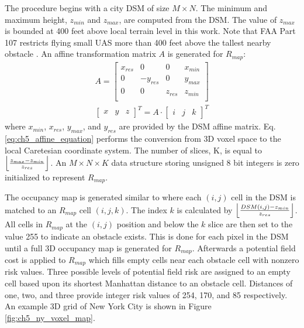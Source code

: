 The procedure begins with a city DSM of size $M\times N$. The minimum and maximum height, $z_{min}$ and $z_{max}$, are computed from the DSM. The value of $z_{max}$ is bounded at 400 feet above local terrain level in this work. Note that FAA Part 107 restricts flying small \ac{UAS} more than 400 feet above the tallest nearby obstacle \cite{federal_aviation_administration_code_2016}. An affine transformation matrix $A$ is generated for $R_{map}$:
\begin{align}
        A = \begin{bmatrix} \label{eq:ch5_affine_matrix}
        x_{res} & 0 & 0 & x_{min} \\
        0 &  -y_{res} & 0 & {y_{max}} \\
        0 &  0 & z_{res} & {z_{min}} \\
        \end{bmatrix}  \\
        \begin{bmatrix}x & y & z  \end{bmatrix}^T = A \cdot \begin{bmatrix}i & j & k  \end{bmatrix}^T \label{eq:ch5_affine_equation}
\end{align}
where $x_{min}$, $x_{res}$, $y_{max}$, and $y_{res}$ are provided by the DSM affine matrix. Eq. \ref{eq:ch5_affine_equation} performs the conversion from 3D voxel space to the local Caretesian coordinate system.  
The number of slices, K, is equal to $\floor*{\frac{z_{max} - z_{min}}{z_{res}}}$. An $M \times N \times K$ data structure storing unsigned 8 bit integers is zero initialized to represent $R_{map}$.

The occupancy map is generated similar to \cite{ten_harmsel_emergency_2017} where each $(i,j)$ cell in the DSM is matched to an $R_{map}$ cell $(i, j, k)$. The index $k$ is calculated by $\floor*{\frac{DSM(i,j) - z_{min}}{z_{res}}}$. All cells in $R_{map}$ at the $(i,j)$ position and below the $k$ slice are then set to the value 255 to indicate an obstacle exists. This is done for each pixel in the DSM until a full 3D occupancy map is generated for $R_{map}$.  Afterwards a potential field cost is applied to $R_{map}$ which fills empty cells near each obstacle cell with nonzero risk values.  Three possible levels of potential field risk are assigned to an empty cell based upon its shortest Manhattan distance to an obstacle cell. Distances of one, two, and three provide integer risk values of 254, 170, and 85 respectively. An example 3D grid of New York City is shown in Figure \ref{fig:ch5_ny_voxel_map}.

